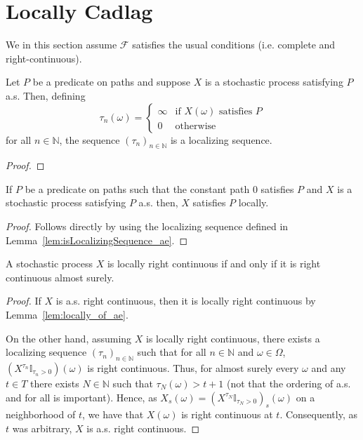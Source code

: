 \section{Locally Cadlag}

We in this section assume $\mathcal{F}$ satisfies the usual conditions (i.e. complete and right-continuous).

\begin{lemma}\label{lem:isLocalizingSequence_ae}
  \leanok
  Let $P$ be a predicate on paths and suppose $X$ is a stochastic process satisfying $P$ a.s. Then, defining
  $$\tau_n(\omega) =
  \begin{cases}
    \infty & \text{if } X(\omega) \text{ satisfies } P \\
    0 & \text{otherwise}
  \end{cases}
  $$
  for all $n \in \mathbb{N}$, the sequence $(\tau_n)_{n \in \mathbb{N}}$ is a localizing sequence.
\end{lemma}

\begin{proof}\leanok
\end{proof}

\begin{lemma}\label{lem:locally_of_ae}
  \leanok
  If $P$ be a predicate on paths such that the constant path $0$ satisfies $P$ and $X$ is a stochastic process satisfying $P$ a.s. then, $X$ satisfies $P$ locally.
\end{lemma}

\begin{proof}\leanok
  Follows directly by using the localizing sequence defined in Lemma~\ref{lem:isLocalizingSequence_ae}.
\end{proof}

\begin{lemma}\label{lem:locally_rightContinuous}
  \leanok
  A stochastic process $X$ is locally right continuous if and only if it is right continuous almost surely.
\end{lemma}

\begin{proof}
  If $X$ is a.s. right continuous, then it is locally right continuous by Lemma~\ref{lem:locally_of_ae}.

  On the other hand, assuming $X$ is locally right continuous, there exists a localizing sequence
  $(\tau_n)_{n \in \mathbb{N}}$ such that for all $n \in \mathbb{N}$ and $\omega \in \Omega$, $(X^{\tau_n}\mathbb{I}_{\tau_n > 0})(\omega)$ is right continuous.
  Thus, for almost surely every $\omega$ and any $t \in T$ there exists $N \in \mathbb{N}$ such that $\tau_N(\omega) > t + 1$ (not that the ordering of a.s. and for all is important). Hence, as
  $X_s(\omega) = (X^{\tau_N}\mathbb{I}_{\tau_N > 0})_s(\omega)$ on a neighborhood of $t$, we have that $X(\omega)$ is right continuous at $t$.
  Consequently, as $t$ was arbitrary, $X$ is a.s. right continuous.
\end{proof}

